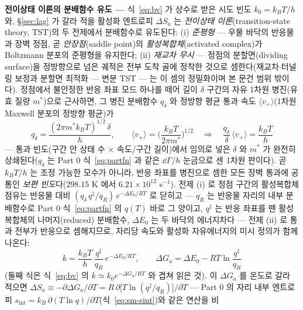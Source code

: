 \begin{bgbox}
\textbf{전이상태 이론의 분배함수 유도 ---} 식~\eqref{eq:bv} 가 상수로 받은 시도 빈도
$k_0=k_BT/h$ 와, \S\ref{sec:lag} 가 갈라 적을 활성화 엔트로피 $\Delta S_a$ 는 \emph{전이상태
이론}(transition-state theory, TST)의 두 전제에서 분배함수로 유도된다\cite{eyring1935,laidlerking1983}:
(i) \emph{준평형} --- 우물 바닥의 반응물과 장벽 정점, 곧 \emph{안장점}(saddle point)의
\emph{활성복합체}(activated complex)가 Boltzmann 분포의 준평형을 유지한다; (ii) \emph{재교차
무시} --- 정점의 분할면(dividing surface)을 정방향으로 넘은 궤적은 전부 도착 골에 정착한
것으로 셈한다(재교차$\cdot$터널링 보정과 분할면 최적화 --- 변분 TST --- 는 이 셈의 정밀화이며 본
문건 범위 밖이다). 정점에서 불안정한 반응 좌표 모드 하나를 떼어 길이 $\delta$ 구간의 자유
1차원 병진(유효 질량 $m^*$)으로 근사하면, 그 병진 분배함수 $q_\delta$ 와 정방향 평균 통과 속도
$\langle v_+\rangle$(1차원 Maxwell 분포의 정방향 평균)가
\begin{equation}
q_\delta=\frac{(2\pi m^*k_BT)^{1/2}\,\delta}{h},\qquad
\langle v_+\rangle=\Big(\frac{k_BT}{2\pi m^*}\Big)^{1/2}
\quad\Longrightarrow\quad
\frac{q_\delta}{\delta}\,\langle v_+\rangle=\frac{k_BT}{h}
\label{eq:tst-freq}
\end{equation}
--- 통과 빈도(구간 안 상태 수 $\times$ 속도/구간 길이)에서 임의로 넣은 $\delta$ 와 $m^*$ 가
완전히 상쇄된다($q_\delta$ 는 Part 0 식~\eqref{eq:partfn} 과 같은 $\dd\Gamma/h$ 눈금으로 센
1차원 판이다). 곧 $k_BT/h$ 는 조정 가능한 모수가 아니라, 반응 좌표를 병진으로 셈한 모든 장벽
통과에 공통인 \emph{보편 빈도}다($298.15$ K 에서 $6.21\times10^{12}$ s$^{-1}$). 전제 (i) 로
정점 구간의 활성복합체 점유는 반응물 대비 $(q_\delta\,q^\ddagger/q_R)\,e^{-\Delta E_0/RT}$ 로
닫히고 --- $q_R$ 는 반응물 자리의 내부 분배함수로 Part 0 식~\eqref{eq:partfn} 의 $q(T)$ 바로
그 양이고, $q^\ddagger$ 는 반응 좌표를 뗀 활성복합체의 나머지(reduced) 분배함수, $\Delta E_0$
는 두 바닥의 에너지차다 --- 전제 (ii) 로 통과 전부가 반응으로 셈해지므로, 자리당 속도와
활성화 자유에너지의 미시 정의가 함께 나온다\cite{glasstone1941,mcquarrie1976}:
\begin{equation}
k=\frac{k_BT}{h}\,\frac{q^\ddagger}{q_R}\,e^{-\Delta E_0/RT},
\qquad
\Delta G_a=\Delta E_0-RT\ln\frac{q^\ddagger}{q_R}
\label{eq:tst-rate}
\end{equation}
(둘째 식은 식~\eqref{eq:bv} 의 $k\simeq k_0e^{-\Delta G_a/RT}$ 와 겹쳐 읽은 것). 이 $\Delta G_a$
를 온도로 갈라 적으면 $\Delta S_a\equiv-\partial\Delta G_a/\partial T
=R\,\partial\big[T\ln(q^\ddagger/q_R)\big]/\partial T$ --- Part 0 의 자리 내부 엔트로피
$s_\mathrm{int}=k_B\,\partial(T\ln q)/\partial T$(식~\eqref{eq:sm-sint})와 같은 연산을 비

\end{bgbox}
